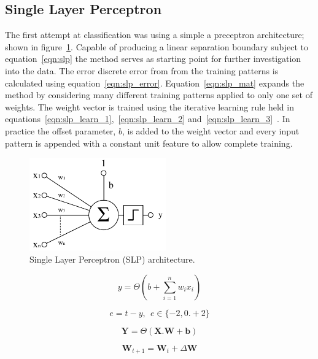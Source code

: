 \documentclass{ecsarticle}     %
\begin{document}
\subsection{Single Layer Perceptron}


The first attempt at classification was using a simple a preceptron architecture; shown in figure~\ref{fig:slp}.
Capable of producing a linear separation boundary subject to equation~\eqref{eqn:slp} the method serves as starting point for further investigation into the data.
The error discrete error from from the training patterns is calculated using equation~\eqref{eqn:slp_error}.
Equation~\eqref{eqn:slp_mat} expands the method by considering many different training patterns applied to only one set of weights.
The weight vector is trained using the iterative learning rule held in equations~\eqref{eqn:slp_learn_1},~\eqref{eqn:slp_learn_2} and~\eqref{eqn:slp_learn_3}~\citep{info05mackay}.
In practice the offset parameter, $b$, is added to the weight vector and every input pattern is appended with a constant unit feature to allow complete training.

\begin{figure}[ht]
   \centering
    \includegraphics[height = 4cm]{SLP.pdf}
   \caption{Single Layer Perceptron (SLP) architecture.}
   \label{fig:slp}
\end{figure}

\begin{equation}
   y = \Theta \left(b + \sum_{i=1}^{n} w_i x_i \right)
   \label{eqn:slp}
\end{equation}

\begin{equation}	
	e = t - y,\:\:e \in \{-2,0.+2\}
	\label{eqn:slp_error}
\end{equation}


\begin{equation}
   \textbf{Y} = \Theta ( \textbf{X}.\textbf{W} + \textbf{b})
   \label{eqn:slp_mat}
\end{equation}

\begin{equation}	
	\textbf{W}_{t+1} = \textbf{W}_t + \Delta \textbf{W}
	\label{eqn:slp_learn_1}
\end{equation}
\end{document}
